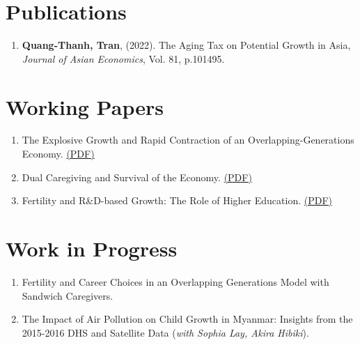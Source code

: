 \section{\sc Publications}
\begin{enumerate}
\item
  {\bf Quang-Thanh, Tran},
  (2022).
  {The Aging Tax on Potential Growth in Asia},
  {\it Journal of Asian Economics}, Vol. 81, p.101495.
\end{enumerate}

\section{\sc Working Papers}
\begin{enumerate}
  \item The Explosive Growth and Rapid Contraction of an Overlapping-Generations Economy. \href{https://www.dropbox.com/scl/fi/a7b1vnmypehibjmd2wim4/main_rapidcontraction.pdf?rlkey=t3aoep2iiy7shjmpq9cp6tuz3&st=b5jwqdqg&dl=0}{(PDF)}
  \item Dual Caregiving and Survival of the Economy. \href{https://www.dropbox.com/scl/fi/s00pcg0017vtyeb364hlc/main_dualcare-copy.pdf?rlkey=koecpcdaoeroijigjm5x4dtzv&st=6rnfdie5&dl=0}{(PDF)}
  \item Fertility and R\&D-based Growth: The Role of Higher Education. \href{https://www.dropbox.com/scl/fi/6bkvc2vxrbst1iwocxwdl/main_overedu.pdf?rlkey=v59fcybxfcd105y2ciassjttn&st=ym5ntxq0&dl=0}{(PDF)}
\end{enumerate}

\section{\sc Work in Progress}
\begin{enumerate}
  \item Fertility and Career Choices in an Overlapping Generations Model with Sandwich Caregivers.
  \item The Impact of Air Pollution on Child Growth in Myanmar: Insights from the 2015-2016 DHS and Satellite Data (\textit{with Sophia Lay, Akira Hibiki}).
\end{enumerate}


